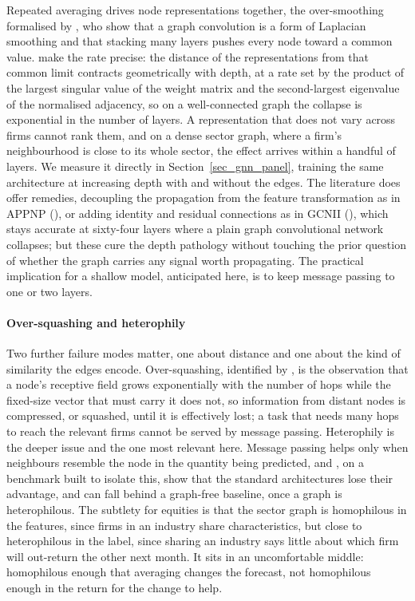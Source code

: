 Repeated averaging drives node representations together, the over-smoothing formalised by \cite{li2018deeper}, who show that a graph convolution is a form of Laplacian smoothing and that stacking many layers pushes every node toward a common value. \cite{oono2020graph} make the rate precise: the distance of the representations from that common limit contracts geometrically with depth, at a rate set by the product of the largest singular value of the weight matrix and the second-largest eigenvalue of the normalised adjacency, so on a well-connected graph the collapse is exponential in the number of layers. A representation that does not vary across firms cannot rank them, and on a dense sector graph, where a firm's neighbourhood is close to its whole sector, the effect arrives within a handful of layers. We measure it directly in Section~\ref{sec_gnn_panel}, training the same architecture at increasing depth with and without the edges. The literature does offer remedies, decoupling the propagation from the feature transformation as in APPNP (\cite{gasteiger2019predict}), or adding identity and residual connections as in GCNII (\cite{chen2020simple}), which stays accurate at sixty-four layers where a plain graph convolutional network collapses; but these cure the depth pathology without touching the prior question of whether the graph carries any signal worth propagating. The practical implication for a shallow model, anticipated here, is to keep message passing to one or two layers.

\paragraph{Over-squashing and heterophily}\label{sec_gnn_squashing}

Two further failure modes matter, one about distance and one about the kind of similarity the edges encode. Over-squashing, identified by \cite{alon2021bottleneck}, is the observation that a node's receptive field grows exponentially with the number of hops while the fixed-size vector that must carry it does not, so information from distant nodes is compressed, or squashed, until it is effectively lost; a task that needs many hops to reach the relevant firms cannot be served by message passing. Heterophily is the deeper issue and the one most relevant here. Message passing helps only when neighbours resemble the node in the quantity being predicted, and \cite{platonov2023critical}, on a benchmark built to isolate this, show that the standard architectures lose their advantage, and can fall behind a graph-free baseline, once a graph is heterophilous. The subtlety for equities is that the sector graph is homophilous in the features, since firms in an industry share characteristics, but close to heterophilous in the label, since sharing an industry says little about which firm will out-return the other next month. It sits in an uncomfortable middle: homophilous enough that averaging changes the forecast, not homophilous enough in the return for the change to help.

